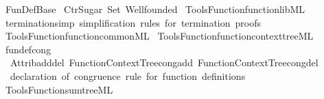 %
\begin{isabellebody}%
%
%
\isadelimdocument
%
\endisadelimdocument
%
\isatagdocument
%
\isamarkuptrue%
%
\endisatagdocument
{\isafolddocument}%
%
\isadelimdocument
%
\endisadelimdocument
%
\isadelimtheory
%
\endisadelimtheory
%
\isatagtheory
{}\isamarkupfalse%
\ Fun{\isacharunderscore}{\kern0pt}Def{\isacharunderscore}{\kern0pt}Base\isanewline
{}\ Ctr{\isacharunderscore}{\kern0pt}Sugar\ Set\ Wellfounded\isanewline
{}%
\endisatagtheory
{\isafoldtheory}%
%
\isadelimtheory
\isanewline
%
\endisadelimtheory
%
\isadelimML
\isanewline
%
\endisadelimML
%
\isatagML
{}\isamarkupfalse%
\ {\isacartoucheopen}Tools{\isacharslash}{\kern0pt}Function{\isacharslash}{\kern0pt}function{\isacharunderscore}{\kern0pt}lib{\isachardot}{\kern0pt}ML{\isacartoucheclose}%
\endisatagML
{\isafoldML}%
%
\isadelimML
\isanewline
%
\endisadelimML
{}\isamarkupfalse%
\ termination{\isacharunderscore}{\kern0pt}simp\ {\isachardoublequoteopen}simplification\ rules\ for\ termination\ proofs{\isachardoublequoteclose}\isanewline
%
\isadelimML
%
\endisadelimML
%
\isatagML
{}\isamarkupfalse%
\ {\isacartoucheopen}Tools{\isacharslash}{\kern0pt}Function{\isacharslash}{\kern0pt}function{\isacharunderscore}{\kern0pt}common{\isachardot}{\kern0pt}ML{\isacartoucheclose}\isanewline
{}\isamarkupfalse%
\ {\isacartoucheopen}Tools{\isacharslash}{\kern0pt}Function{\isacharslash}{\kern0pt}function{\isacharunderscore}{\kern0pt}context{\isacharunderscore}{\kern0pt}tree{\isachardot}{\kern0pt}ML{\isacartoucheclose}\isanewline
\isanewline
{}\isamarkupfalse%
\ fundef{\isacharunderscore}{\kern0pt}cong\ {\isacharequal}{\kern0pt}\isanewline
\ \ {\isacartoucheopen}Attrib{\isachardot}{\kern0pt}add{\isacharunderscore}{\kern0pt}del\ Function{\isacharunderscore}{\kern0pt}Context{\isacharunderscore}{\kern0pt}Tree{\isachardot}{\kern0pt}cong{\isacharunderscore}{\kern0pt}add\ Function{\isacharunderscore}{\kern0pt}Context{\isacharunderscore}{\kern0pt}Tree{\isachardot}{\kern0pt}cong{\isacharunderscore}{\kern0pt}del{\isacartoucheclose}\isanewline
\ \ {\isachardoublequoteopen}declaration\ of\ congruence\ rule\ for\ function\ definitions{\isachardoublequoteclose}\isanewline
\isanewline
{}\isamarkupfalse%
\ {\isacartoucheopen}Tools{\isacharslash}{\kern0pt}Function{\isacharslash}{\kern0pt}sum{\isacharunderscore}{\kern0pt}tree{\isachardot}{\kern0pt}ML{\isacartoucheclose}%
\endisatagML
{\isafoldML}%
%
\isadelimML
\isanewline
%
\endisadelimML
%
\isadelimtheory
\isanewline
%
\endisadelimtheory
%
\isatagtheory
{}\isamarkupfalse%
%
\endisatagtheory
{\isafoldtheory}%
%
\isadelimtheory
%
\endisadelimtheory
%
\end{isabellebody}%

